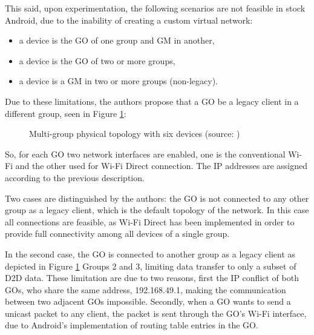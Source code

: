 This said, upon experimentation, the following scenarios are not feasible in stock Android, due to the inability of creating a custom virtual network:

\begin{itemize}
\item a device is the \gls{GO} of one group and \gls{GM} in another,
\item a device is the \gls{GO} of two or more groups,
\item a device is a \gls{GM} in two or more groups (non-legacy).
\end{itemize}

Due to these limitations, the authors propose that a \gls{GO} be a legacy client in a different group, seen in Figure \ref{fig:mgrouprouting}:

\begin{figure}[ht]
	\noindent{}
	\caption{\label{fig:mgrouprouting} Multi-group physical topology with six devices (source: \cite{routeMultiGroup})}
\end{figure}

So, for each \gls{GO} two network interfaces are enabled, one is the conventional Wi-Fi and the other used for Wi-Fi Direct connection. The \gls{IP} addresses are assigned according to the previous description.

Two cases are distinguished by the authors: the \gls{GO} is not connected to any other group as a legacy client, which is the default topology of the network. In this case all connections are feasible, as Wi-Fi Direct has been implemented in order to provide full connectivity among all devices of a single group.

In the second case, the \gls{GO} is connected to another group as a legacy client as depicted in Figure \ref{fig:mgrouprouting} Groups 2 and 3, limiting data transfer to only a subset of D2D data. These limitation are due to two reasons, first the \gls{IP} conflict of both \glspl{GO}, who share the same address, 192.168.49.1, making the communication between two adjacent \glspl{GO} impossible. Secondly, when a \gls{GO} wants to send a unicast packet to any client, the packet is sent through the \gls{GO}'s Wi-Fi interface, due to Android's implementation of routing table entries in the \gls{GO}.


